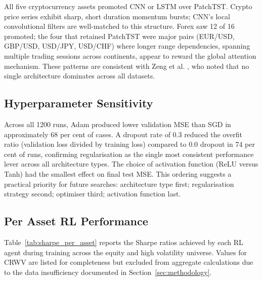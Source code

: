 \documentclass[journal]{IEEEtran}
\begin{document}
All five cryptocurrency assets promoted CNN or LSTM over PatchTST. Crypto
price series exhibit sharp, short duration momentum bursts; CNN's local
convolutional filters are well-matched to this structure. Forex saw 12 of
16 promoted; the four that retained PatchTST were major pairs (EUR/USD,
GBP/USD, USD/JPY, USD/CHF) where longer range dependencies, spanning
multiple trading sessions across continents, appear to reward the global
attention mechanism. These patterns are consistent with Zeng et
al. \cite{transformerseff}, who noted that no single architecture
dominates across all datasets.

\subsection{Hyperparameter Sensitivity}

Across all 1200 runs, Adam produced lower validation MSE than SGD in
approximately 68 per cent of cases. A dropout rate of 0.3 reduced the
overfit ratio (validation loss divided by training loss) compared to 0.0
dropout in 74 per cent of runs, confirming regularisation as the single
most consistent performance lever across all architecture types. The
choice of activation function (ReLU versus Tanh) had the smallest effect
on final test MSE. This ordering suggests a practical priority for future
searches: architecture type first; regularisation strategy second;
optimiser third; activation function last.

\subsection{Per Asset RL Performance}

Table~\ref{tab:sharpe_per_asset} reports the Sharpe ratios achieved by
each RL agent during training across the equity and high volatility
universe. Values for CRWV are listed for completeness but excluded from
aggregate calculations due to the data insufficiency documented in
Section~\ref{sec:methodology}.
\end{document}
